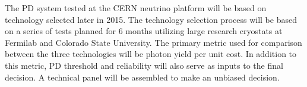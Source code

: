 The PD system tested at the CERN neutrino platform will be based on technology selected later in 2015. The technology selection process will be based on a series of tests planned for 6 months utilizing large research cryostats at Fermilab and Colorado State University. The primary metric used for comparison between the three technologies will be photon yield per unit cost. In addition to this metric, PD threshold and reliability will also serve as inputs to the final decision. A technical panel will be assembled to make an unbiased decision. 

